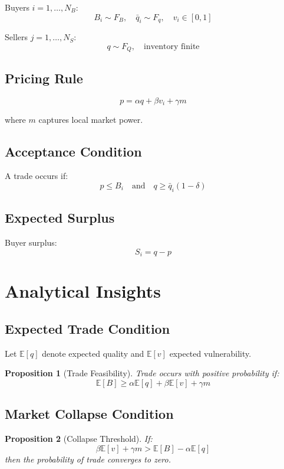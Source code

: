 \documentclass[12pt]{article}
\newtheorem{proposition}{Proposition}
\begin{document}
Buyers $i=1,\dots,N_B$:
\[
B_i \sim F_B, \quad \bar{q}_i \sim F_q, \quad v_i \in [0,1]
\]

Sellers $j=1,\dots,N_S$:
\[
q \sim F_Q, \quad \text{inventory finite}
\]

\subsection{Pricing Rule}

\[
p = \alpha q + \beta v_i + \gamma m
\]

where $m$ captures local market power.

\subsection{Acceptance Condition}

A trade occurs if:
\[
p \leq B_i \quad \text{and} \quad q \geq \bar{q}_i (1 - \delta)
\]

\subsection{Expected Surplus}

Buyer surplus:
\[
S_i = q - p
\]

\section{Analytical Insights}

\subsection{Expected Trade Condition}

Let $\mathbb{E}[q]$ denote expected quality and $\mathbb{E}[v]$ expected vulnerability.

\begin{proposition}[Trade Feasibility]
Trade occurs with positive probability if:
\[
\mathbb{E}[B] \geq \alpha \mathbb{E}[q] + \beta \mathbb{E}[v] + \gamma m
\]
\end{proposition}

\subsection{Market Collapse Condition}

\begin{proposition}[Collapse Threshold]
If:
\[
\beta \mathbb{E}[v] + \gamma m > \mathbb{E}[B] - \alpha \mathbb{E}[q]
\]
then the probability of trade converges to zero.
\end{proposition}
\end{document}
